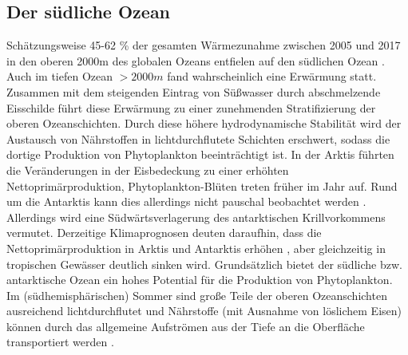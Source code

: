 \documentclass[12pt,a4paper,onecolumn]{scrartcl}
\begin{document}
\subsection{Der südliche Ozean}
Schätzungsweise 45-62 \% der gesamten Wärmezunahme zwischen 2005 und 2017 in den oberen 2000m des globalen Ozeans entfielen auf den südlichen Ozean \citep{Portner.2019}. Auch im tiefen Ozean $>2000m$ fand wahrscheinlich eine Erwärmung statt. Zusammen mit dem steigenden Eintrag von Süßwasser durch abschmelzende Eisschilde führt diese Erwärmung zu  einer zunehmenden Stratifizierung der oberen Ozeanschichten. Durch diese höhere hydrodynamische Stabilität wird  der Austausch von Nährstoffen in lichtdurchflutete Schichten erschwert, sodass die dortige Produktion von Phytoplankton beeinträchtigt ist. In der Arktis führten die Veränderungen in der Eisbedeckung zu einer erhöhten Nettoprimärproduktion, Phytoplankton-Blüten treten früher im Jahr auf. Rund um die Antarktis kann dies allerdings nicht pauschal beobachtet werden \citep{Portner.2019}. Allerdings wird eine Südwärtsverlagerung des antarktischen Krillvorkommens vermutet. Derzeitige Klimaprognosen deuten daraufhin, dass die Nettoprimärproduktion in Arktis und Antarktis erhöhen , aber gleichzeitig in tropischen Gewässer deutlich sinken wird. Grundsätzlich bietet der südliche bzw. antarktische Ozean ein hohes Potential für die Produktion von Phytoplankton. Im (südhemisphärischen) Sommer sind große Teile der oberen Ozeanschichten ausreichend lichtdurchflutet und Nährstoffe (mit Ausnahme von löslichem Eisen) können durch das allgemeine Aufströmen aus der Tiefe an die Oberfläche transportiert werden \citep{Martin.1990}.
\end{document}
